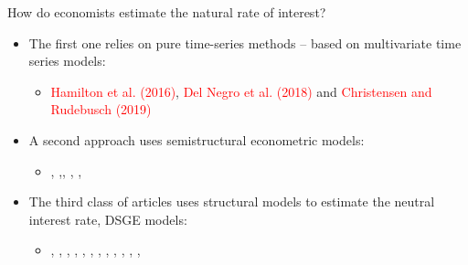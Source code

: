 \documentclass[9pt]{beamer}
\begin{document}
\begin{frame}{How do economists estimate the natural rate of interest?}
\begin{itemize}


\item  The first one relies on pure time-series methods – based on
multivariate time series models: 
\begin{itemize}
    \item \textcolor{red}{Hamilton et al. (2016)}, \textcolor{red}{Del Negro et al. (2018)} and \textcolor{red}{Christensen and Rudebusch (2019)} 

\end{itemize}

\item A second approach uses semistructural econometric models:
\begin{itemize}
    \item \textcolor{red}{\citet{LW:2003}}, \textcolor{red}{\citet{HLW:2017} },\textcolor{red}{\citet{Renne:2007}}, \textcolor{red}{\citet{Wynne:2018}}, \textcolor{red}{\citet{Us:2018}}, \textcolor{red}{\citet{Lewis:2017}}
\end{itemize}

\item The third class of articles uses structural models to estimate the neutral interest rate, DSGE models:
\begin{itemize}
    \item \textcolor{red}{\citet{Neiss:2003}},
\textcolor{red}{\citet{Edge:2008}}, \textcolor{red}{\citet{Lopez-Salido:2009}}, \textcolor{red}{\citet{Bjornland:2011}}, \textcolor{red}{\citet{Justiniano:2010} }, \textcolor{red}{\citet{Melosi:2015}}, \textcolor{red}{\citet{Canzoneri:2015}}, \textcolor{red}{\citet{Curdia:2015}}, \textcolor{red}{\citet{Hristov:2016}}, \textcolor{red}{\citet{DelNegro:2017}},  \textcolor{red}{\citet{Neri:2018}}, \textcolor{red}{\citet{Grossman:2019}}, \textcolor{red}{\citet{Gali:2019}  }

\end{itemize}


\end{itemize}
\end{frame}
\end{document}
